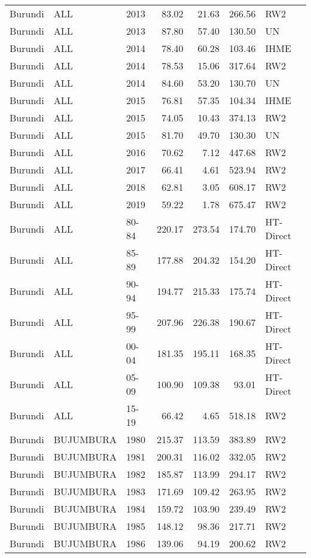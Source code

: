 \begin{longtable}{lllrrrl}
  Burundi & ALL & 2013 & 83.02 & 21.63 & 266.56 & RW2 \\ 
  Burundi & ALL & 2013 & 87.80 & 57.40 & 130.50 & UN \\ 
  Burundi & ALL & 2014 & 78.40 & 60.28 & 103.46 & IHME \\ 
  Burundi & ALL & 2014 & 78.53 & 15.06 & 317.64 & RW2 \\ 
  Burundi & ALL & 2014 & 84.60 & 53.20 & 130.70 & UN \\ 
  Burundi & ALL & 2015 & 76.81 & 57.35 & 104.34 & IHME \\ 
  Burundi & ALL & 2015 & 74.05 & 10.43 & 374.13 & RW2 \\ 
  Burundi & ALL & 2015 & 81.70 & 49.70 & 130.30 & UN \\ 
  Burundi & ALL & 2016 & 70.62 & 7.12 & 447.68 & RW2 \\ 
  Burundi & ALL & 2017 & 66.41 & 4.61 & 523.94 & RW2 \\ 
  Burundi & ALL & 2018 & 62.81 & 3.05 & 608.17 & RW2 \\ 
  Burundi & ALL & 2019 & 59.22 & 1.78 & 675.47 & RW2 \\ 
  Burundi & ALL & 80-84 & 220.17 & 273.54 & 174.70 & HT-Direct \\ 
  Burundi & ALL & 85-89 & 177.88 & 204.32 & 154.20 & HT-Direct \\ 
  Burundi & ALL & 90-94 & 194.77 & 215.33 & 175.74 & HT-Direct \\ 
  Burundi & ALL & 95-99 & 207.96 & 226.38 & 190.67 & HT-Direct \\ 
  Burundi & ALL & 00-04 & 181.35 & 195.11 & 168.35 & HT-Direct \\ 
  Burundi & ALL & 05-09 & 100.90 & 109.38 & 93.01 & HT-Direct \\ 
  Burundi & ALL & 15-19 & 66.42 & 4.65 & 518.18 & RW2 \\ 
  Burundi & BUJUMBURA & 1980 & 215.37 & 113.59 & 383.89 & RW2 \\ 
  Burundi & BUJUMBURA & 1981 & 200.31 & 116.02 & 332.05 & RW2 \\ 
  Burundi & BUJUMBURA & 1982 & 185.87 & 113.99 & 294.17 & RW2 \\ 
  Burundi & BUJUMBURA & 1983 & 171.69 & 109.42 & 263.95 & RW2 \\ 
  Burundi & BUJUMBURA & 1984 & 159.72 & 103.90 & 239.49 & RW2 \\ 
  Burundi & BUJUMBURA & 1985 & 148.12 & 98.36 & 217.71 & RW2 \\ 
  Burundi & BUJUMBURA & 1986 & 139.06 & 94.19 & 200.62 & RW2 \\ 

\end{longtable}
